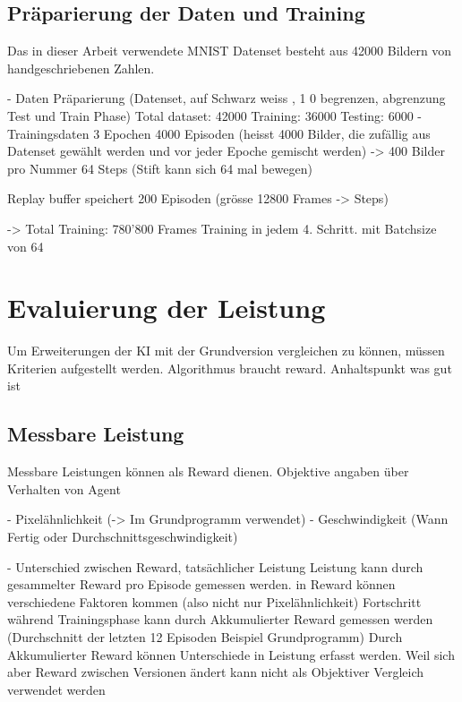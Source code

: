 \subsection*{Präparierung der Daten und Training}
Das in dieser Arbeit verwendete MNIST Datenset besteht aus 42000 Bildern von handgeschriebenen Zahlen. 



- Daten Präparierung (Datenset, auf Schwarz weiss , 1 0 begrenzen, abgrenzung Test und Train Phase)
    Total dataset: 42000
    Training: 36000
    Testing: 6000
- Trainingsdaten 
    3 Epochen
    4000 Episoden (heisst 4000 Bilder, die zufällig aus Datenset gewählt werden und vor jeder Epoche gemischt werden) -> 400 Bilder pro Nummer
    64 Steps (Stift kann sich 64 mal bewegen)

    Replay buffer speichert 200 Episoden (grösse 12800 Frames -> Steps)

    -> Total Training: 780'800 Frames
    Training in jedem 4. Schritt. mit Batchsize von 64



\section{Evaluierung der Leistung}
    Um Erweiterungen der KI mit der Grundversion vergleichen zu können, müssen Kriterien aufgestellt werden. 
    Algorithmus braucht reward. Anhaltspunkt was gut ist
    
    \subsection*{Messbare Leistung}
    Messbare Leistungen können als Reward dienen. Objektive angaben über Verhalten von Agent
    
    - Pixelähnlichkeit (-> Im Grundprogramm verwendet)
    - Geschwindigkeit (Wann Fertig oder Durchschnittsgeschwindigkeit)
    
    - Unterschied zwischen Reward, tatsächlicher Leistung
      Leistung kann durch gesammelter Reward pro Episode gemessen werden. in Reward können verschiedene Faktoren kommen (also nicht nur Pixelähnlichkeit)
      Fortschritt während Trainingsphase kann durch Akkumulierter Reward gemessen werden (Durchschnitt der letzten 12 Episoden Beispiel Grundprogramm)
      Durch Akkumulierter Reward können Unterschiede in Leistung erfasst werden. Weil sich aber Reward zwischen Versionen ändert kann nicht als Objektiver Vergleich verwendet werden
    
